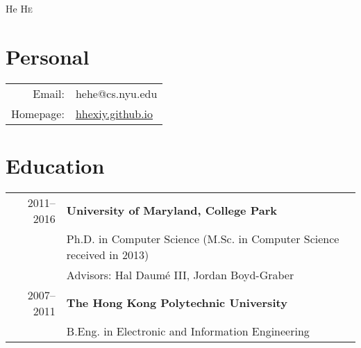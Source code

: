 \documentclass[a4paper,11pt]{article}
\begin{document}
\pagestyle{empty} %

\par{\centering
        {\Huge He \textsc{He}
    }\bigskip\par}

\section{Personal}

\begin{tabular}{rl}
    Email:     & hehe@cs.nyu.edu \\
	Homepage:  & \url{hhexiy.github.io}	
\end{tabular}


\section{Education}
\begin{tabular}{rl}    
2011--2016 & \textbf{University of Maryland, College Park}\\
    & Ph.D. in Computer Science (M.Sc. in Computer Science received in 2013) \\
    & Advisors: Hal Daum\'e III, Jordan Boyd-Graber \\[1.5ex]
2007--2011 & \textbf{The Hong Kong Polytechnic University}\\
& B.Eng. in Electronic and Information Engineering
\end{tabular}
\end{document}
